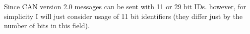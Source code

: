 Since CAN version 2.0 messages can be sent with 11 or 29 bit IDs. however, for simplicity I will just consider usage of 11 bit identifiers (they differ just by the number of bits in this field).

